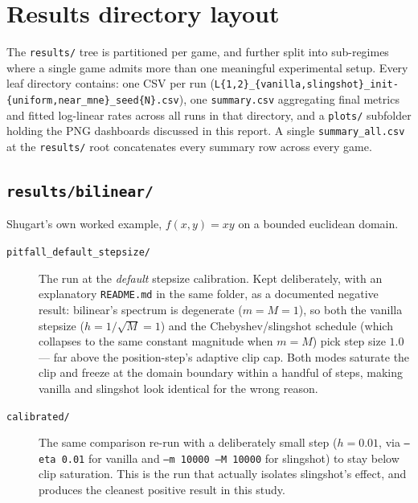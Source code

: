 \documentclass[11pt]{article}
\begin{document}
\section{Results directory layout}
\label{sec:layout}
The \texttt{results/} tree is partitioned per game, and further split into
sub-regimes where a single game admits more than one meaningful experimental
setup. Every leaf directory contains: one CSV per run
(\texttt{L\{1,2\}\_\{vanilla,slingshot\}\_init-\{uniform,near\_mne\}\_seed\{N\}.csv}),
one \texttt{summary.csv} aggregating final metrics and fitted log-linear rates
across all runs in that directory, and a \texttt{plots/} subfolder holding the
PNG dashboards discussed in this report. A single \texttt{summary\_all.csv} at
the \texttt{results/} root concatenates every summary row across every game.

\subsection{\texttt{results/bilinear/}}
Shugart's own worked example, $f(x,y) = xy$ on a bounded euclidean domain.
\begin{description}
  \item[\texttt{pitfall\_default\_stepsize/}] The run at the \emph{default}
  stepsize calibration. Kept deliberately, with an explanatory
  \texttt{README.md} in the same folder, as a documented negative result:
  bilinear's spectrum is degenerate ($m=M=1$), so both the vanilla stepsize
  ($h=1/\sqrt{M}=1$) and the Chebyshev/slingshot schedule (which collapses to
  the same constant magnitude when $m=M$) pick step size $1.0$ --- far above
  the position-step's adaptive clip cap. Both modes saturate the clip and
  freeze at the domain boundary within a handful of steps, making vanilla and
  slingshot look identical for the wrong reason.
  \item[\texttt{calibrated/}] The same comparison re-run with a deliberately
  small step ($h=0.01$, via \texttt{--eta 0.01} for vanilla and
  \texttt{--m 10000 --M 10000} for slingshot) to stay below clip saturation.
  This is the run that actually isolates slingshot's effect, and produces the
  cleanest positive result in this study.
\end{description}
\end{document}
